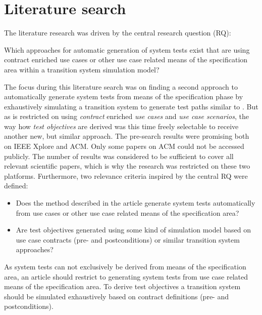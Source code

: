 \section{Literature search} \label{literaturesearch}

The literature research was driven by the central research question (RQ): 

\glqq Which approaches for automatic generation of system tests exist that are using contract enriched use cases or other use case related means of the specification area within a transition system simulation model?\grqq 

The focus during this literature search was on finding a second approach to automatically generate system tests from means of the specification phase by exhaustively simulating a transition system to generate test paths similar to \cite{ClementineNebut2006}. But as \cite{ClementineNebut2006} is restricted on using \textit{contract} enriched \textit{use cases} and \textit{use case scenarios}, the way how \textit{test objectives} are derived was this time freely selectable to receive another new, but similar approach. The pre-search results were promising both on IEEE Xplore and ACM. Only some papers on ACM could not be accessed publicly. The number of results was considered to be sufficient to cover all relevant scientific papers, which is why the research was restricted on these two platforms. Furthermore, two relevance criteria inspired by the central RQ were defined:

\begin{itemize}
	\item Does the method described in the article generate system tests automatically from use cases or other use case related means of the specification area?
	\item Are test objectives generated using some kind of simulation model based on use case contracts (pre- and postconditions) or similar transition system approaches?
\end{itemize} 

As system tests can not exclusively be derived from means of the specification area, an article should restrict to generating system tests from use case related means of the specification area. To derive test objectives a transition system should be simulated exhaustively based on contract definitions (pre- and postconditions). 

